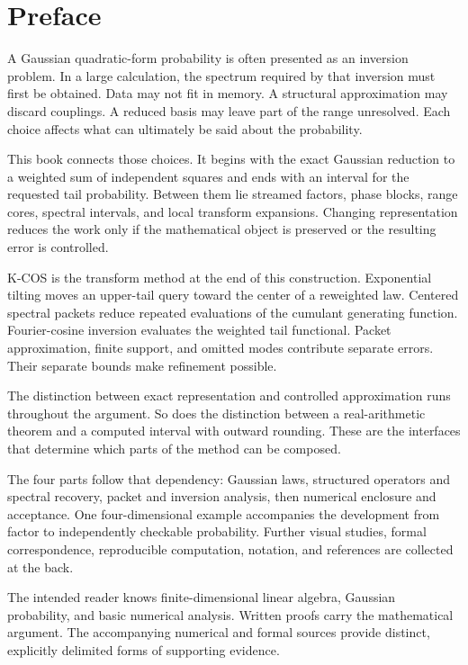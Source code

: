 \chapter*{Preface}
A Gaussian quadratic-form probability is often presented as an inversion problem. In a large calculation, the spectrum required by that inversion must first be obtained. Data may not fit in memory. A structural approximation may discard couplings. A reduced basis may leave part of the range unresolved. Each choice affects what can ultimately be said about the probability.

This book connects those choices. It begins with the exact Gaussian reduction to a weighted sum of independent squares and ends with an interval for the requested tail probability. Between them lie streamed factors, phase blocks, range cores, spectral intervals, and local transform expansions. Changing representation reduces the work only if the mathematical object is preserved or the resulting error is controlled.

K-COS is the transform method at the end of this construction. Exponential tilting moves an upper-tail query toward the center of a reweighted law. Centered spectral packets reduce repeated evaluations of the cumulant generating function. Fourier-cosine inversion evaluates the weighted tail functional. Packet approximation, finite support, and omitted modes contribute separate errors. Their separate bounds make refinement possible.

The distinction between exact representation and controlled approximation runs throughout the argument. So does the distinction between a real-arithmetic theorem and a computed interval with outward rounding. These are the interfaces that determine which parts of the method can be composed.

The four parts follow that dependency: Gaussian laws, structured operators and spectral recovery, packet and inversion analysis, then numerical enclosure and acceptance. One four-dimensional example accompanies the development from factor to independently checkable probability. Further visual studies, formal correspondence, reproducible computation, notation, and references are collected at the back.

The intended reader knows finite-dimensional linear algebra, Gaussian probability, and basic numerical analysis. Written proofs carry the mathematical argument. The accompanying numerical and formal sources provide distinct, explicitly delimited forms of supporting evidence.


